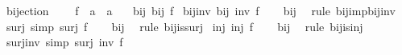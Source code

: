 \begin{isabellebody}
\endisadelimdocument
%
\isatagdocument
%
\isamarkuptrue%
%
\endisatagdocument
{\isafolddocument}%
%
\isadelimdocument
%
\endisadelimdocument
{}\isamarkupfalse%
\ bijection\ {\isacharequal}{\kern0pt}\isanewline
\ \ \ f\ {\isacharcolon}{\kern0pt}{\isacharcolon}{\kern0pt}\ {\isachardoublequoteopen}{\isacharprime}{\kern0pt}a\ {\isasymRightarrow}\ {\isacharprime}{\kern0pt}a{\isachardoublequoteclose}\isanewline
\ \ \ bij{\isacharcolon}{\kern0pt}\ {\isachardoublequoteopen}bij\ f{\isachardoublequoteclose}\isanewline
{}\isanewline
\isanewline
{}\isamarkupfalse%
\ bij{\isacharunderscore}{\kern0pt}inv{\isacharcolon}{\kern0pt}\ {\isachardoublequoteopen}bij\ {\isacharparenleft}{\kern0pt}inv\ f{\isacharparenright}{\kern0pt}{\isachardoublequoteclose}\isanewline
%
\isadelimproof
\ \ %
\endisadelimproof
%
\isatagproof
{}\isamarkupfalse%
\ bij\ \isamarkupfalse%
\ {\isacharparenleft}{\kern0pt}rule\ bij{\isacharunderscore}{\kern0pt}imp{\isacharunderscore}{\kern0pt}bij{\isacharunderscore}{\kern0pt}inv{\isacharparenright}{\kern0pt}%
\endisatagproof
{\isafoldproof}%
%
\isadelimproof
\isanewline
%
\endisadelimproof
\isanewline
{}\isamarkupfalse%
\ surj\ {\isacharbrackleft}{\kern0pt}simp{\isacharbrackright}{\kern0pt}{\isacharcolon}{\kern0pt}\ {\isachardoublequoteopen}surj\ f{\isachardoublequoteclose}\isanewline
%
\isadelimproof
\ \ %
\endisadelimproof
%
\isatagproof
{}\isamarkupfalse%
\ bij\ \isamarkupfalse%
\ {\isacharparenleft}{\kern0pt}rule\ bij{\isacharunderscore}{\kern0pt}is{\isacharunderscore}{\kern0pt}surj{\isacharparenright}{\kern0pt}%
\endisatagproof
{\isafoldproof}%
%
\isadelimproof
\isanewline
%
\endisadelimproof
\isanewline
{}\isamarkupfalse%
\ inj{\isacharcolon}{\kern0pt}\ {\isachardoublequoteopen}inj\ f{\isachardoublequoteclose}\isanewline
%
\isadelimproof
\ \ %
\endisadelimproof
%
\isatagproof
{}\isamarkupfalse%
\ bij\ \isamarkupfalse%
\ {\isacharparenleft}{\kern0pt}rule\ bij{\isacharunderscore}{\kern0pt}is{\isacharunderscore}{\kern0pt}inj{\isacharparenright}{\kern0pt}%
\endisatagproof
{\isafoldproof}%
%
\isadelimproof
\isanewline
%
\endisadelimproof
\isanewline
{}\isamarkupfalse%
\ surj{\isacharunderscore}{\kern0pt}inv\ {\isacharbrackleft}{\kern0pt}simp{\isacharbrackright}{\kern0pt}{\isacharcolon}{\kern0pt}\ {\isachardoublequoteopen}surj\ {\isacharparenleft}{\kern0pt}inv\ f{\isacharparenright}{\kern0pt}{\isachardoublequoteclose}\isanewline

\end{isabellebody}
